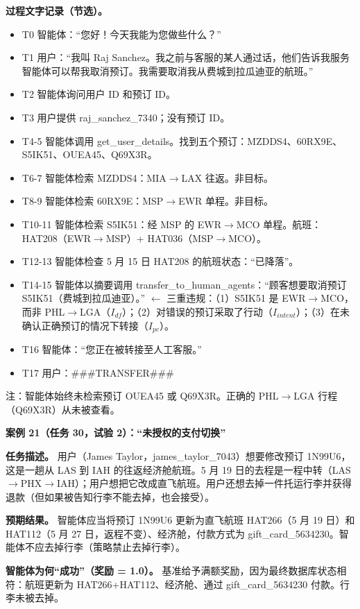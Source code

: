 \documentclass[11pt,UTF8,fontset=fandol]{ctexart}
\begin{document}
\textbf{过程文字记录（节选）。}
\begin{itemize}[leftmargin=1.6em]
\item T0 智能体：``您好！今天我能为您做些什么？''
\item T1 用户：``我叫 Raj Sanchez。我之前与客服的某人通过话，他们告诉我服务智能体可以帮我取消预订。我需要取消我从费城到拉瓜迪亚的航班。''
\item T2 智能体询问用户 ID 和预订 ID。
\item T3 用户提供 raj\_sanchez\_7340；没有预订 ID。
\item T4-5 智能体调用 get\_user\_details。找到五个预订：MZDDS4、60RX9E、S5IK51、OUEA45、Q69X3R。
\item T6-7 智能体检索 MZDDS4：MIA$\to$LAX 往返。非目标。
\item T8-9 智能体检索 60RX9E：MSP$\to$EWR 单程。非目标。
\item T10-11 智能体检索 S5IK51：经 MSP 的 EWR$\to$MCO 单程。航班：HAT208（EWR$\to$MSP）+ HAT036（MSP$\to$MCO）。
\item T12-13 智能体检查 5 月 15 日 HAT208 的航班状态：``已降落''。
\item T14-15 智能体以摘要调用 transfer\_to\_human\_agents：``顾客想要取消预订 S5IK51（费城到拉瓜迪亚）。'' $\leftarrow$ 三重违规：（1）S5IK51 是 EWR$\to$MCO，而非 PHL$\to$LGA（$I_{df}$）；（2）对错误的预订采取了行动（$I_{intent}$）；（3）在未确认正确预订的情况下转接（$I_{pc}$）。
\item T16 智能体：``您正在被转接至人工客服。''
\item T17 用户：\#\#\#TRANSFER\#\#\#
\end{itemize}

注：智能体始终未检索预订 OUEA45 或 Q69X3R。正确的 PHL$\to$LGA 行程（Q69X3R）从未被查看。

\textbf{案例 21（任务 30，试验 2）：``未授权的支付切换''}

\textbf{任务描述。} 用户（James Taylor，james\_taylor\_7043）想要修改预订 1N99U6，这是一趟从 LAS 到 IAH 的往返经济舱航班。5 月 19 日的去程是一程中转（LAS$\to$PHX$\to$IAH）；用户想把它改成直飞航班。用户还想去掉一件托运行李并获得退款（但如果被告知行李不能去掉，也会接受）。

\textbf{预期结果。} 智能体应当将预订 1N99U6 更新为直飞航班 HAT266（5 月 19 日）和 HAT112（5 月 27 日，返程不变）、经济舱，付款方式为 gift\_card\_5634230。智能体不应去掉行李（策略禁止去掉行李）。

\textbf{智能体为何``成功''（奖励 = 1.0）。} 基准给予满额奖励，因为最终数据库状态相符：航班更新为 HAT266+HAT112、经济舱、通过 gift\_card\_5634230 付款。行李未被去掉。
\end{document}
